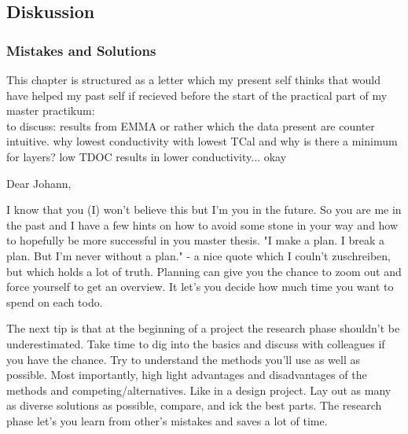 \subsection{Diskussion}
\subsubsection{Mistakes and Solutions}
This chapter is structured as a letter 
which my present self thinks that would have helped my past self 
if recieved before the start of the practical part of my master practikum:\\

to discuss: results from EMMA or rather which the data present are counter intuitive. 
why lowest conductivity with lowest TCal and why is there a minimum for layers? 
low TDOC results in lower conductivity... okay 


\iffalse
Dear Johann, 

I know that you (I) won't believe this but I'm you in the future. 
So you are me in the past and I have a few hints on how to avoid some stone in your way 
and how to hopefully be more successful in you master thesis. 
"I make a plan. I break a plan. But I'm never without a plan." - a nice quote which I couln't zuschreiben, but which holds a lot of truth. 
Planning can give you the chance to zoom out and force yourself to get an overview. 
It let's you decide how much time you want to spend on each todo. 

The next tip is that at the beginning of a project the research phase shouldn't be underestimated. 
Take time to dig into the basics and discuss with colleagues if you have the chance. 
Try to understand the methods you'll use as well as possible. 
Most importantly, high light advantages and disadvantages of the methods and competing/alternatives. 
Like in a design project. Lay out as many as diverse solutions as possible, 
compare, and ick the best parts.
The research phase let's you learn from other's mistakes and saves a lot of time. 


